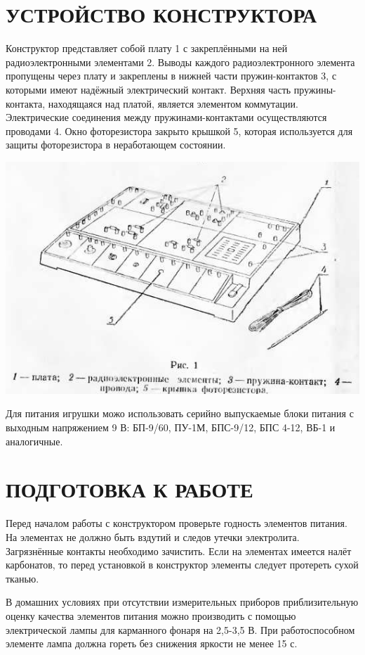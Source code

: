 \documentclass[12pt]{article}
\begin{document}
\section{УСТРОЙСТВО КОНСТРУКТОРА}
Конструктор представляет собой плату 1 с закреплёнными на ней радиоэлектронными элементами 2. Выводы каждого радиоэлектронного элемента пропущены через плату и закреплены в нижней части пружин-контактов 3, с которыми имеют надёжный электрический контакт. Верхняя часть пружины-контакта, находящаяся над платой, является элементом коммутации. Электрические соединения между пружинами-контактами осуществляются проводами 4. Окно фоторезистора закрыто крышкой 5, которая используется для защиты фоторезистора в неработающем состоянии.

\includegraphics[scale=0.8]{ekon3_004}

Для питания игрушки можо использовать серийно выпускаемые блоки питания с выходным напряжением 9 В: БП-9/60, ПУ-1М, БПС-9/12, БПС 4-12, ВБ-1 и аналогичные.
\newpage
\section{ПОДГОТОВКА К РАБОТЕ}
Перед началом работы с конструктором проверьте годность элементов питания. На элементах не должно быть вздутий и следов утечки электролита. Загрязнённые контакты необходимо зачистить. Если на элементах имеется налёт карбонатов, то перед установкой в конструктор элементы следует протереть сухой тканью.

В домашних условиях при отсутствии измерительных приборов приблизительную оценку качества элементов питания можно производить с помощью электрической лампы для карманного фонаря на 2,5-3,5 В. При работоспособном элементе лампа должна гореть без снижения яркости не менее 15 с.
\end{document}
